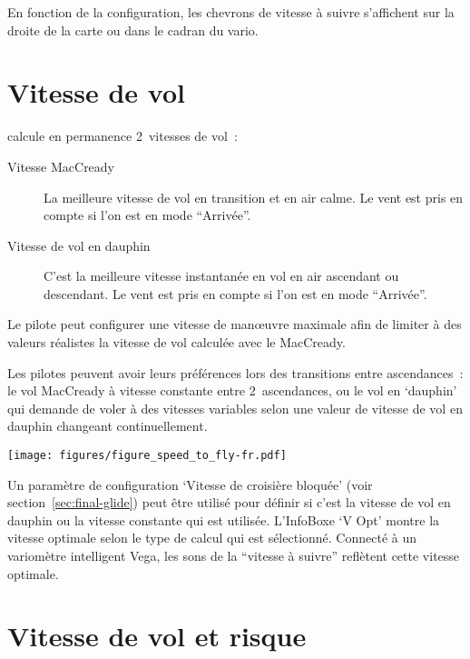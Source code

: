 En fonction de la configuration, les chevrons de vitesse à suivre s'affichent sur la droite de la carte ou dans le cadran du vario.


\section{Vitesse de vol}\label{sec:stf}

\xc{} calcule en permanence 2~vitesses de vol~:
\begin{description}
\item[Vitesse MacCready] La meilleure vitesse de vol en transition et en air calme.
Le vent est pris en compte si l'on est en mode ``Arrivée''.
\item[Vitesse de vol en dauphin] C'est la meilleure vitesse instantanée en vol en air ascendant ou descendant.
Le vent est pris en compte si l'on est en mode ``Arrivée''.
\end{description}

Le pilote peut configurer une vitesse de manœuvre maximale afin de limiter à des valeurs réalistes la vitesse de vol calculée avec le MacCready.

Les pilotes peuvent avoir leurs préférences lors des transitions entre ascendances~: le vol MacCready à vitesse constante entre 2~ascendances, ou le vol en `dauphin' qui demande de voler à des vitesses variables selon une valeur de vitesse de vol en dauphin changeant continuellement.

\begin{center}
\texttt{[image: figures/figure\_speed\_to\_fly-fr.pdf]}
\end{center}

Un paramètre de configuration `Vitesse de croisière bloquée' (voir section~\ref{sec:final-glide}) peut être utilisé pour définir si c'est la vitesse de vol en dauphin ou la vitesse constante qui est utilisée.
L'InfoBoxe `V Opt' montre la vitesse optimale selon le type de calcul qui est sélectionné.
Connecté à un variomètre intelligent Vega, les sons de la ``vitesse à suivre'' reflètent cette vitesse optimale.


\section{Vitesse de vol et risque}\label{sec:safety-factor}

